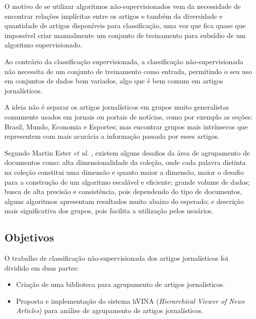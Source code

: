 \documentclass[a4paper,12pt]{article}
\begin{document}
O motivo de se utilizar algoritmos não-supervisionados vem da necessidade de encontrar relações implícitas entre os artigos e também da diversidade e quantidade de artigos disponíveis para classificação, uma vez que fica quase que impossível criar manualmente um conjunto de treinamento para subsídio de um algoritmo supervisionado.

Ao contrário da classificação supervisionada, a classificação não-supervisionada não necessita de um conjunto de treinamento como entrada, permitindo o seu uso em conjuntos de dados bem variados, algo que é bem comum em artigos jornalísticos.

A ideia não é separar os artigos jornalísticos em grupos muito generalistas comumente usados em jornais ou portais de notícias, como por exemplo as seções: Brasil, Mundo, Economia e Esportes; mas encontrar grupos mais intrínsecos que representem com mais acurácia a informação passada por esses artigos.


Segundo Martin Ester \textit{et al.} \cite{Ester03}, existem alguns desafios da área de agrupamento de documentos como: alta dimensionalidade da coleção, onde cada palavra distinta na coleção constitui uma dimensão e quanto maior a dimensão, maior o desafio para a construção de um algoritmo escalável e eficiente; grande volume de dados; busca de alta precisão e consistência, pois dependendo do tipo de documentos, alguns algoritmos apresentam resultados muito abaixo do esperado; e descrição mais significativa dos grupos, pois facilita a utilização pelos usuários.


\subsection{Objetivos}

O trabalho de classificação não-supervisionada dos artigos jornalísticos foi dividido em duas partes:

\begin{itemize}
\item Criação de uma biblioteca para agrupamento de artigos jornalísticos.
\item Proposta e implementação do sistema hVINA (\textit{Hierarchical Viewer of News Articles}) para análise de agrupamento de artigos jornalísticos.
\end{itemize}
\end{document}
